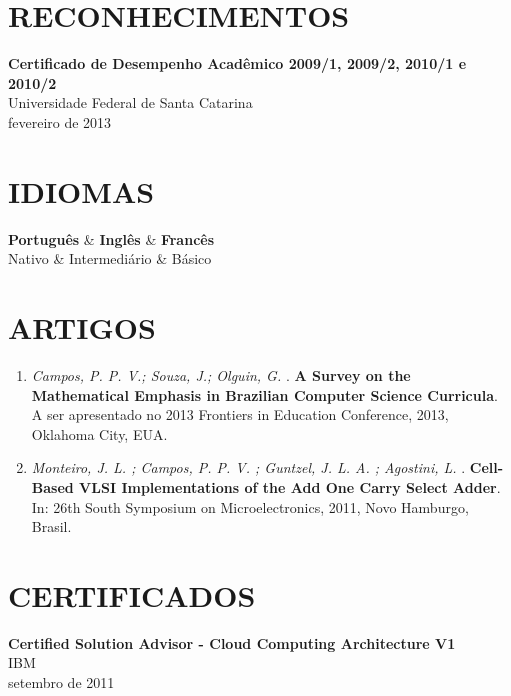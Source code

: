 \documentclass[margin=<value>,11pt]{res} %
\begin{document}
\begin{resume}
\section{RECONHECIMENTOS}
	{\bf Certificado de Desempenho Acadêmico 2009/1, 2009/2, 2010/1 e 2010/2}\\
	Universidade Federal de Santa Catarina\\
	fevereiro de 2013

\section{IDIOMAS}
	\begin{ncolumn}{3}
	{\bf Português} & {\bf Inglês}        & {\bf Francês} \\
	Nativo    & Intermediário & Básico  \\
	\end{ncolumn}

\section{ARTIGOS}
\begin{enumerate}
	\item \emph{Campos, P. P. V.; Souza, J.; Olguin, G.} . \textbf{A Survey on the Mathematical Emphasis in Brazilian Computer Science Curricula}. A ser apresentado no 2013 Frontiers in Education Conference, 2013, Oklahoma City, EUA.
	\item \emph{Monteiro, J. L. ; Campos, P. P. V. ; Guntzel, J. L. A. ; Agostini, L.} . \textbf{Cell-Based VLSI Implementations of the Add One Carry Select Adder}. In: 26th South Symposium on Microelectronics, 2011, Novo Hamburgo, Brasil.
\end{enumerate}


\section{CERTIFICADOS}
{\bf Certified Solution Advisor - Cloud Computing Architecture V1}\\
IBM\\
setembro de 2011

\end{resume} 
\end{document}
